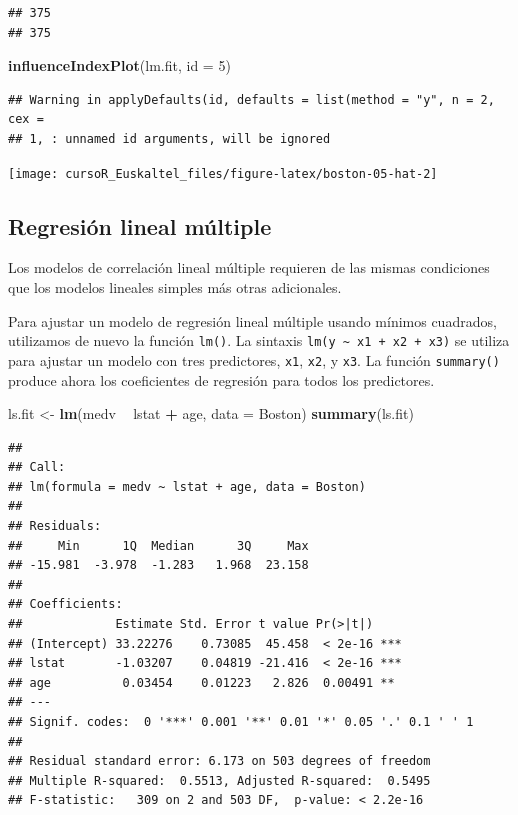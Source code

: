 \documentclass[]{book}
\newenvironment{Shaded}{\begin{snugshade}}{\end{snugshade}}
\newcommand{\KeywordTok}[1]{\textcolor[rgb]{0.13,0.29,0.53}{\textbf{#1}}}
\newcommand{\DataTypeTok}[1]{\textcolor[rgb]{0.13,0.29,0.53}{#1}}
\newcommand{\DecValTok}[1]{\textcolor[rgb]{0.00,0.00,0.81}{#1}}
\newcommand{\StringTok}[1]{\textcolor[rgb]{0.31,0.60,0.02}{#1}}
\newcommand{\OperatorTok}[1]{\textcolor[rgb]{0.81,0.36,0.00}{\textbf{#1}}}
\newcommand{\NormalTok}[1]{#1}
\begin{document}
\begin{verbatim}
## 375 
## 375
\end{verbatim}

\begin{Shaded}
\begin{Highlighting}[]
\KeywordTok{influenceIndexPlot}\NormalTok{(lm.fit, }\DataTypeTok{id =} \DecValTok{5}\NormalTok{)}
\end{Highlighting}
\end{Shaded}

\begin{verbatim}
## Warning in applyDefaults(id, defaults = list(method = "y", n = 2, cex =
## 1, : unnamed id arguments, will be ignored
\end{verbatim}

\begin{center}\texttt{[image: cursoR\_Euskaltel\_files/figure-latex/boston-05-hat-2]} \end{center}

\subsection{Regresión lineal múltiple}\label{regresion-lineal-multiple}

Los modelos de correlación lineal múltiple requieren de las mismas
condiciones que los modelos lineales simples más otras adicionales.

Para ajustar un modelo de regresión lineal múltiple usando mínimos
cuadrados, utilizamos de nuevo la función \texttt{lm()}. La sintaxis
\texttt{lm(y\ \textasciitilde{}\ x1\ +\ x2\ +\ x3)} se utiliza para
ajustar un modelo con tres predictores, \texttt{x1}, \texttt{x2}, y
\texttt{x3}. La función \texttt{summary()} produce ahora los
coeficientes de regresión para todos los predictores.

\begin{Shaded}
\begin{Highlighting}[]
\NormalTok{ls.fit <-}\StringTok{ }\KeywordTok{lm}\NormalTok{(medv }\OperatorTok{~}\StringTok{ }\NormalTok{lstat }\OperatorTok{+}\StringTok{ }\NormalTok{age, }\DataTypeTok{data =}\NormalTok{ Boston)}
\KeywordTok{summary}\NormalTok{(ls.fit)}
\end{Highlighting}
\end{Shaded}

\begin{verbatim}
## 
## Call:
## lm(formula = medv ~ lstat + age, data = Boston)
## 
## Residuals:
##     Min      1Q  Median      3Q     Max 
## -15.981  -3.978  -1.283   1.968  23.158 
## 
## Coefficients:
##             Estimate Std. Error t value Pr(>|t|)    
## (Intercept) 33.22276    0.73085  45.458  < 2e-16 ***
## lstat       -1.03207    0.04819 -21.416  < 2e-16 ***
## age          0.03454    0.01223   2.826  0.00491 ** 
## ---
## Signif. codes:  0 '***' 0.001 '**' 0.01 '*' 0.05 '.' 0.1 ' ' 1
## 
## Residual standard error: 6.173 on 503 degrees of freedom
## Multiple R-squared:  0.5513, Adjusted R-squared:  0.5495 
## F-statistic:   309 on 2 and 503 DF,  p-value: < 2.2e-16
\end{verbatim}
\end{document}
